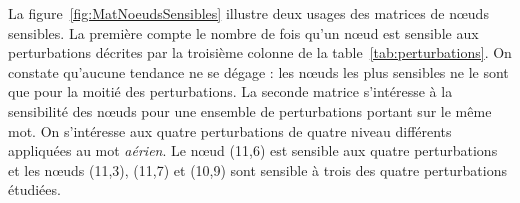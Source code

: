         La figure~\ref{fig:MatNoeudsSensibles} illustre deux usages des matrices de nœuds sensibles. La première compte le nombre de fois qu'un nœud est sensible aux perturbations décrites par la troisième colonne de  la table~\ref{tab:perturbations}. On constate qu'aucune tendance ne se dégage : les nœuds les plus sensibles ne le sont que pour la moitié des perturbations. La seconde matrice s'intéresse à la sensibilité des nœuds pour une ensemble de perturbations portant sur le même mot. On s'intéresse aux quatre perturbations de quatre niveau différents appliquées au mot \textit{aérien}. Le nœud (11,6) est sensible aux quatre perturbations et les nœuds (11,3), (11,7) et (10,9) sont sensible à trois des quatre perturbations étudiées. 